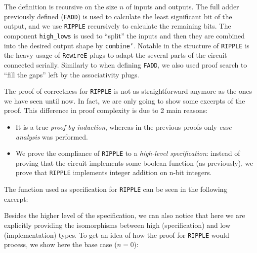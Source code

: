 
            The definition is recursive on the size $n$ of inputs and outputs. The full adder
            previously defined (\texttt{FADD}) is used to calculate the least significant bit of the
            output, and we use \texttt{RIPPLE} recursively to calculate the remaining bits. The
            component \texttt{high\_lows} is used to ``split'' the inputs and then they are combined
            into the desired output shape by \texttt{combine'}. Notable in the structure of
            \texttt{RIPPLE} is the heavy usage of \texttt{RewireE} plugs to adapt the several parts
            of the circuit connected serially. Similarly to when defining \texttt{FADD}, we also
            used proof search to ``fill the gaps'' left by the associativity plugs.

            The proof of correctness for \texttt{RIPPLE} is not as straightforward anymore as the
            ones we have seen until now. In fact, we are only going to show some excerpts of the
            proof. This difference in proof complexity is due to 2 main reasons:

            \begin{itemize}
                \item It is a true \emph{proof by induction}, whereas in the previous proofs only
                    \emph{case analysis} was performed.
                \item We prove the compliance of \texttt{RIPPLE} to a \emph{high-level
                        specification}: instead of proving that the circuit implements some boolean
                    function (as previously), we prove that \texttt{RIPPLE} implements integer
                    addition on n-bit integers.
            \end{itemize}

            The function used as specification for \texttt{RIPPLE} can be seen in the following
            excerpt:


            Besides the higher level of the specification, we can also notice that here we are
            explicitly providing the isomorphisms between high (specification) and low
            (implementation) types. To get an idea of how the proof for \texttt{RIPPLE} would
            process, we show here the base case ($n = 0$):


